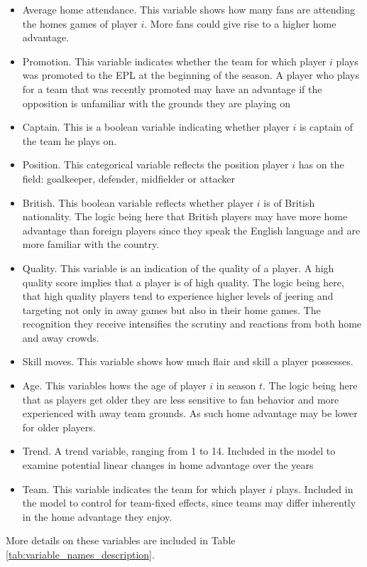 \begin{itemize}
    \item Average home attendance. This variable shows how many fans are attending the homes games of player $i$. More fans could give rise to a higher home advantage.
    \item Promotion. This variable indicates whether the team for which player $i$ plays was promoted to the EPL at the beginning of the season. A player who plays for a team that was recently promoted may have an advantage if the opposition is unfamiliar with the grounds they are playing on
    \item Captain. This is a boolean variable indicating whether player $i$ is captain of the team he plays on.
    \item Position. This categorical variable reflects the position player $i$ has on the field: goalkeeper, defender, midfielder or attacker
    \item British. This boolean variable reflects whether player $i$ is of British nationality. The logic being here that British players may have more home advantage than foreign players since they speak the English language and are more familiar with the country.
    \item Quality. This variable is an indication of the quality of a player. A high quality score implies that a player is of high quality. The logic being here, that high quality players tend to experience higher levels of jeering and targeting not only in away games but also in their home games. The recognition they receive intensifies the scrutiny and reactions from both home and away crowds.
    \item Skill moves. This variable shows how much flair and skill a player possesses.
    \item Age. This variables hows the age of player $i$ in season $t$. The logic being here that as players get older they are less sensitive to fan behavior and more experienced with away team grounds. As such home advantage may be lower for older players.
    \item Trend. A trend variable, ranging from 1 to 14. Included in the model to examine potential linear changes in home advantage over the years
    \item Team. This variable indicates the team for which player $i$ plays. Included in the model to control for team-fixed effects, since teams may differ inherently in the home advantage they enjoy.
\end{itemize}
More details on these variables are included in Table \ref{tab:variable_names_description}. \\

